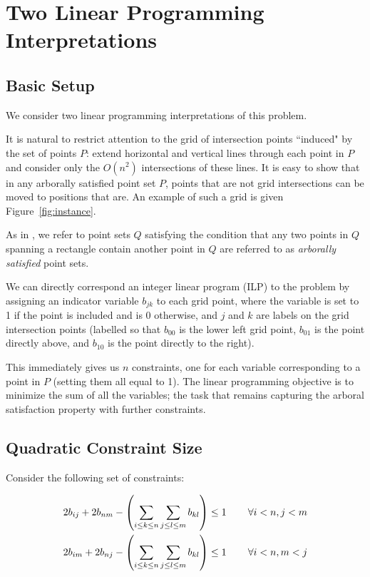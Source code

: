 \documentclass[11pt]{article}
\begin{document}
\section{Two Linear Programming Interpretations}

\subsection{Basic Setup}

We consider two linear programming interpretations of this problem.

It is natural to restrict attention to the grid of intersection points ``induced" by the set of points $P$: extend horizontal and vertical lines through each point in $P$ and consider only the $O(n^2)$ intersections of these lines. It is easy to show that in any arborally satisfied point set $P$, points that are not grid intersections can be moved to positions that are. An example of such a grid is given Figure~\ref{fig:instance}.

As in \cite{geometryBST}, we refer to point sets $Q$ satisfying the condition that any two points in $Q$ spanning a rectangle contain another point in $Q$ are referred to as \emph{arborally satisfied} point sets.

We can directly correspond an integer linear program (ILP) to the problem by assigning an indicator variable $b_{jk}$ to each grid point, where the variable is set to 1 if the point is included and is 0 otherwise, and $j$ and $k$ are labels on the grid intersection points (labelled so that $b_{00}$ is the lower left grid point, $b_{01}$ is the point directly above, and $b_{10}$ is the point directly to the right). 

This immediately gives us $n$ constraints, one for each variable corresponding to a point in $P$ (setting them all equal to 1). The linear programming objective is to minimize the sum of all the variables; the task that remains capturing the arboral satisfaction property with further constraints. 

\subsection{Quadratic Constraint Size}

Consider the following set of constraints:

\begin{align}
2b_{ij} + 2b_{nm} - \left(\sum_{i \leq k \leq n}\sum_{j\leq l \leq m} b_{kl}\right) &\leq 1  \hspace{.3in} \forall i<n, j<m \\
2b_{im} + 2b_{nj} - \left(\sum_{i \leq k \leq n}\sum_{j\leq l \leq m} b_{kl}\right)  &\leq 1  \hspace{.3in} \forall i<n, m<j
\end{align}
\end{document}
